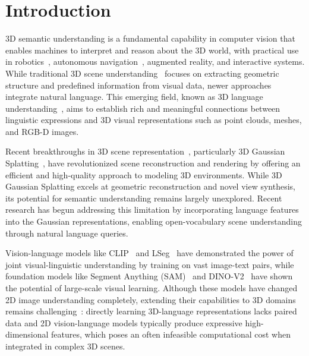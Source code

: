 \section{Introduction}
\label{sec:intro}

3D semantic understanding is a fundamental capability in computer vision that enables machines to interpret and reason about the 3D world, with practical use in robotics~\cite{rosinol20203ddynamicscenegraphs}, autonomous navigation~\cite{zhou2020cylinder3d, tian2024drivevlmconvergenceautonomousdriving}, augmented reality, and interactive systems. While traditional 3D scene understanding~\cite{gupta2015indoor} focuses on extracting geometric structure and predefined information from visual data, newer approaches integrate natural language. This emerging field, known as 3D language understanding~\cite{peng2023openscene3dsceneunderstanding, kerr2023lerf, gu2023conceptgraphsopenvocabulary3dscene, liu2023weakly, ha2022semantic, zhang2023clip, takmaz2023openmask3d, ding2023pla}, aims to establish rich and meaningful connections between linguistic expressions and 3D visual representations such as point clouds, meshes, and RGB-D images.

Recent breakthroughs in 3D scene representation~\cite{nerf, kerbl3Dgaussians, sun2022direct, yu2021plenoxels}, particularly 3D Gaussian Splatting~\cite{kerbl3Dgaussians, Yu2024MipSplatting}, have revolutionized scene reconstruction and rendering by offering an efficient and high-quality approach to modeling 3D environments. While 3D Gaussian Splatting excels at geometric reconstruction and novel view synthesis, its potential for semantic understanding remains largely unexplored. Recent research has begun addressing this limitation by incorporating language features into the Gaussian representations, enabling open-vocabulary scene understanding through natural language queries. 

Vision-language models like CLIP~\cite{caron2021emerging} and LSeg~\cite{ghiasi2022scaling} have demonstrated the power of joint visual-linguistic understanding by training on vast image-text pairs, while foundation models like Segment Anything (SAM)~\cite{kirillov2023segment} and DINO-V2~\cite{oquab2024dinov2} have shown the potential of large-scale visual learning.
Although these models have changed 2D image understanding completely, extending their capabilities to 3D domains remains challenging~\cite{qin2024langsplat, peng20243d, wu2024opengaussian, shi2024language, ye2025gaussian, bhalgat2024n2f2}: directly learning 3D-language representations lacks paired data and 2D vision-language models typically produce expressive high-dimensional features, which poses an often infeasible computational cost when integrated in complex 3D scenes.

